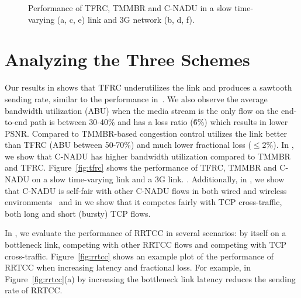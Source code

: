 \begin{figure}[!t]
  \centerline{
  }
  \centerline{
  }
  \centerline{
  }
  \caption{Performance of TFRC, TMMBR and C-NADU in a slow time-varying (a, c, e) link and 3G network (b, d, f).}
  \label{fig:3g}
\end{figure}

\section{Analyzing the Three Schemes}

Our results in  shows that TFRC underutilizes the link and
produces a sawtooth sending rate, similar to the performance
in~\cite{saurin:2006:thesis}. We also observe the average bandwidth
utilization (ABU) when the media stream is the only flow on the end-to-end
path is between 30-40\% and has a loss ratio (\~6\%) which results in lower
PSNR. Compared to TMMBR-based congestion control utilizes the link better than
TFRC (ABU between 50-70\%) and much lower fractional loss ($\le$2\%). In
, we show that C-NADU has higher bandwidth utilization
compared to TMMBR and TFRC. Figure~\ref{fig:tfrc} shows the performance of
TFRC, TMMBR and C-NADU on a slow time-varying link and a 3G link. .
Additionally, in , we show that C-NADU is self-fair with
other C-NADU flows in both wired and wireless
environments~\cite{singh:2010.thesis} and in  we show that it
competes fairly with TCP cross-traffic, both long and short (bursty) TCP
flows.




In , we evaluate the performance of RRTCC in several
scenarios: by itself on a bottleneck link, competing with other RRTCC flows
and competing with TCP cross-traffic. Figure~\ref{fig:rrtcc} shows an example
plot of the performance of RRTCC when increasing latency and fractional loss.
For example, in Figure~\ref{fig:rrtcc}(a) by increasing the bottleneck link
latency reduces the sending rate of RRTCC.

